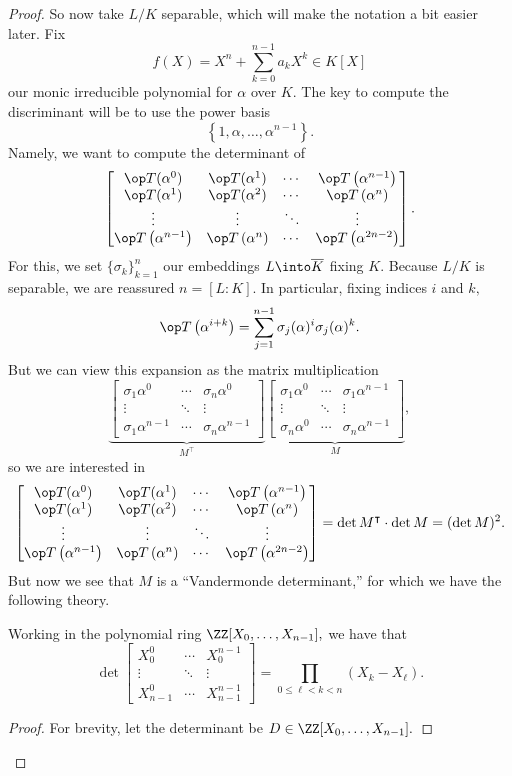 \begin{proof}
	So now take $L/K$ separable, which will make the notation a bit easier later. Fix
	\[f(X)=X^n+\sum_{k=0}^{n-1}a_kX^k\in K[X]\]
	our monic irreducible polynomial for $\alpha$ over $K.$ The key to compute the discriminant will be to use the power basis
	\[\left\{1,\alpha,\ldots,\alpha^{n-1}\right\}.\]
	Namely, we want to compute the determinant of
	\[\begin{bmatrix}
		\op T(\alpha^0) & \op T(\alpha^1) & \cdots & \op T\left(\alpha^{n-1}\right) \\
		\op T(\alpha^1) & \op T(\alpha^2) & \cdots & \op T\left(\alpha^n\right)\\
		\vdots & \vdots & \ddots & \vdots \\
		\op T\left(\alpha^{n-1}\right) & \op T\left(\alpha^n\right) & \cdots & \op T\left(\alpha^{2n-2}\right)
	\end{bmatrix}.\]
	For this, we set $\{\sigma_k\}_{k=1}^n$ our embeddings $L\into\overline K$ fixing $K.$ Because $L/K$ is separable, we are reassured $n=[L:K].$ In particular, fixing indices $i$ and $k,$
	\[\op T\left(\alpha^{i+k}\right)=\sum_{j=1}^{n-1}\sigma_j(\alpha)^i\sigma_j(\alpha)^k.\]
	But we can view this expansion as the matrix multiplication
	\[\underbrace{\begin{bmatrix}
		\sigma_1\alpha^0 & \cdots & \sigma_n\alpha^0 \\
		\vdots & \ddots & \vdots \\
		\sigma_1\alpha^{n-1} & \cdots & \sigma_n\alpha^{n-1}
	\end{bmatrix}}_{M^\intercal}\underbrace{\begin{bmatrix}
		\sigma_1\alpha^0 & \cdots & \sigma_1\alpha^{n-1} \\
		\vdots & \ddots & \vdots \\
		\sigma_n\alpha^0 & \cdots & \sigma_n\alpha^{n-1}
	\end{bmatrix}}_M,\]
	so we are interested in
	\[\begin{bmatrix}
		\op T(\alpha^0) & \op T(\alpha^1) & \cdots & \op T\left(\alpha^{n-1}\right) \\
		\op T(\alpha^1) & \op T(\alpha^2) & \cdots & \op T\left(\alpha^n\right)\\
		\vdots & \vdots & \ddots & \vdots \\
		\op T\left(\alpha^{n-1}\right) & \op T\left(\alpha^n\right) & \cdots & \op T\left(\alpha^{2n-2}\right)
	\end{bmatrix}=\det M^\intercal\cdot\det M=(\det M)^2.\]
	But now we see that $M$ is a ``Vandermonde determinant,'' for which we have the following theory.
	\begin{lemma} \label{lem:vandermonde}
		Working in the polynomial ring $\ZZ[X_0,\ldots,X_{n-1}],$ we have that
		\[\det\begin{bmatrix}
			X_0^0 & \cdots & X_0^{n-1} \\
			\vdots & \ddots & \vdots \\
			X_{n-1}^0 & \cdots & X_{n-1}^{n-1}
		\end{bmatrix}=\prod_{0\le \ell<k<n}(X_k-X_\ell).\]
	\end{lemma}
	\begin{proof}
		For brevity, let the determinant be $D\in\ZZ[X_0,\ldots,X_{n-1}].$
		

\end{proof}
\end{proof}

